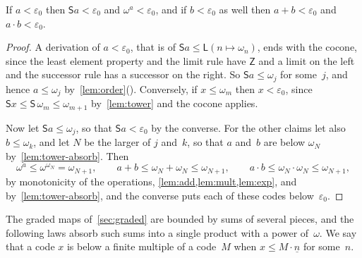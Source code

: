 \documentclass[11pt]{amsart}
\makeatletter
\newcommand{\bZ}{\mathsf{Z}}
\newcommand{\bS}{\mathsf{S}}
\newcommand{\bL}{\mathsf{L}}
\newcommand{\bplus}{\mathbin{+}}
\newcommand{\btimes}{\mathbin{\cdot}}
\newcommand{\num}[1]{\underline{#1}}          %
\newcommand{\eps}{\varepsilon_{0}}
\newcommand{\tower}[1]{\omega_{#1}}           %
\newif\ifagdarefs
\newcommand{\AgdaRefs}[1]{\ifagdarefs{\footnotesize\color{agdablue}(#1)}\else\unskip\fi}
\newcommand{\Agda}[2]{{\footnotesize\color{agdablue}\textsf{#1}%
  \ifblank{#2}{}{\texttt{.}\allowbreak\texttt{#2}}}}
\let\ttt@plain\texttt
\renewcommand{\texttt}[1]{{\footnotesize\color{agdablue}\ttt@plain{#1}}}
\theoremstyle{plain}
\theoremstyle{definition}
\makeatother
\begin{document}
\begin{proposition}[Closure of $\eps$]
\label{prop:closure}
If $a < \eps$ then $\bS a < \eps$ and $\omega^{a} < \eps$, and if
$b < \eps$ as well then $a \bplus b < \eps$ and $a \btimes b < \eps$.
\AgdaRefs{\Agda{BrouwerOrdinals.Epsilon0}{⊕-<-ε₀}; \texttt{S-<-ε₀},
\texttt{ω\^{}-<-ε₀}; \Agda{BrouwerOrdinals.MultClosure}{⊗-<-ε₀}.}
\end{proposition}

\begin{proof}
A derivation of $a < \eps$, that is of
$\bS a \le \bL(n \mapsto \tower n)$, ends with the cocone, since the
least element property and the limit rule have $\bZ$ and a limit on the
left and the successor rule has a successor on the right. So
$\bS a \le \tower j$ for some~$j$, and hence $a \le \tower j$
by~\cref{lem:order}(). Conversely, if
$x \le \tower m$ then $x < \eps$, since
$\bS x \le \bS\,\tower m \le \tower{m+1}$ by~\cref{lem:tower} and the
cocone applies.

Now let $\bS a \le \tower j$, so that $\bS a < \eps$ by the converse.
For the other claims let also $b \le \tower k$, and let $N$ be the
larger of $j$ and~$k$, so that $a$ and~$b$ are below $\tower N$
by~\cref{lem:tower-absorb}. Then
\[
  \omega^{a} \le \omega^{\tower N} = \tower{N+1} , \qquad
  a \bplus b \le \tower N \bplus \tower N \le \tower{N+1} , \qquad
  a \btimes b \le \tower N \btimes \tower N \le \tower{N+1} ,
\]
by monotonicity of the operations, \cref{lem:add,lem:mult,lem:exp},
and by~\cref{lem:tower-absorb}, and the converse puts each of these
codes below~$\eps$.
\AgdaRefs{\Agda{BrouwerOrdinals.Epsilon0}{tower-mono-ℕ};
\texttt{tower-double}; \Agda{BrouwerOrdinals.MultClosure}{tower-sq}.}
\end{proof}

The graded maps of~\cref{sec:graded} are bounded by sums of several
pieces, and the following laws absorb such sums into a single product
with a power of~$\omega$. We say that a code $x$ is below a finite
multiple of a code~$M$ when $x \le M \btimes \num n$ for some~$n$.
\end{document}
